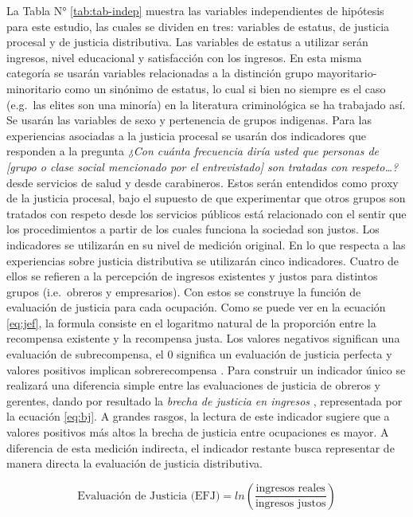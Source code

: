 \documentclass[12pt,twoside]{templates/facsothesis}
\begin{document}
La Tabla N° \ref{tab:tab-indep} muestra las variables independientes de hipótesis para este estudio, las cuales se dividen en tres: variables de estatus, de justicia procesal y de justicia distributiva. Las variables de estatus a utilizar serán ingresos, nivel educacional y satisfacción con los ingresos. En esta misma categoría se usarán variables relacionadas a la distinción grupo mayoritario-minoritario como un sinónimo de estatus, lo cual si bien no siempre es el caso (e.g.~las elites son una minoría) en la literatura criminológica se ha trabajado así. Se usarán las variables de sexo y pertenencia de grupos indigenas. Para las experiencias asociadas a la justicia procesal se usarán dos indicadores que responden a la pregunta \emph{¿Con cuánta frecuencia diría usted que personas de {[}grupo o clase social mencionado por el entrevistado{]} son tratadas con respeto\ldots?} desde servicios de salud y desde carabineros. Estos serán entendidos como proxy de la justicia procesal, bajo el supuesto de que experimentar que otros grupos son tratados con respeto desde los servicios públicos está relacionado con el sentir que los procedimientos a partir de los cuales funciona la sociedad son justos. Los indicadores se utilizarán en su nivel de medición original. En lo que respecta a las experiencias sobre justicia distributiva se utilizarán cinco indicadores. Cuatro de ellos se refieren a la percepción de ingresos existentes y justos para distintos grupos (i.e.~obreros y empresarios). Con estos se construye la función de evaluación de justicia para cada ocupación. Como se puede ver en la ecuación \eqref{eq:jef}, la formula consiste en el logaritmo natural de la proporción entre la recompensa existente y la recompensa justa. Los valores negativos significan una evaluación de subrecompensa, el 0 significa un evaluación de justicia perfecta y valores positivos implican sobrerecompensa \citep{Jasso1980}. Para construir un indicador único se realizará una diferencia simple entre las evaluaciones de justicia de obreros y gerentes, dando por resultado la \emph{brecha de justicia en ingresos} \citep{Verwiebe2000}, representada por la ecuación \eqref{eq:bj}. A grandes rasgos, la lectura de este indicador sugiere que a valores positivos más altos la brecha de justicia entre ocupaciones es mayor. A diferencia de esta medición indirecta, el indicador restante busca representar de manera directa la evaluación de justicia distributiva.

\begin{equation}
   \text{Evaluación de Justicia (EFJ)}= ln(\frac{\text{ingresos reales}}{\text{ingresos justos}}) \label{eq:jef}
\end{equation}
\end{document}
